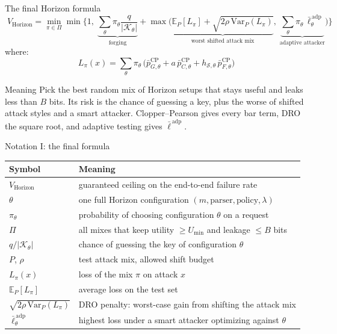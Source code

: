 \documentclass[aspectratio=169,11pt]{beamer}
\begin{document}
\begin{frame}{The final Horizon formula}
  \footnotesize
  \[
    \boxed{\;
    V_{\mathrm{Horizon}} = \min_{\pi \in \Pi} \min\Bigg\{1,\;
    \underbrace{\sum_\theta \pi_\theta \frac{q}{|\mathcal{K}_\theta|}}_{\text{forging}}
    + \max\Big(
    \underbrace{\mathbb{E}_P[L_\pi] + \sqrt{2\rho\,\mathrm{Var}_P(L_\pi)}}_{\text{worst shifted attack mix}},\;
    \underbrace{\sum_\theta \pi_\theta\,\bar\ell^{\,\mathrm{adp}}_\theta}_{\text{adaptive attacker}}
    \Big)\Bigg\}\;}
  \]
  \vspace{-0.3em}
  where:
  \[
    L_\pi(x) = \sum_\theta \pi_\theta\,\Big(\bar p^{\mathrm{CP}}_{G,\theta}
    + a\,\bar p^{\mathrm{CP}}_{C,\theta}
    + h_{\mathcal{S},\theta}\,\bar p^{\mathrm{CP}}_{F,\theta}\Big)
  \]
  \begin{block}{Meaning}
    Pick the best random mix of Horizon setups that stays useful and leaks less than $B$ bits. Its risk is the chance of guessing a key, plus the worse of shifted attack styles and a smart attacker. Clopper--Pearson gives every bar term, DRO the square root, and adaptive testing gives $\bar\ell^{\,\mathrm{adp}}$.
  \end{block}
\end{frame}

\begin{frame}{Notation I: the final formula}
  \centering\small
  \begin{tabular}{@{}ll@{}}
    \toprule
    \textbf{Symbol} & \textbf{Meaning} \\
    \midrule
    $V_{\mathrm{Horizon}}$ & guaranteed ceiling on the end-to-end failure rate \\
    $\theta$ & one full Horizon configuration $(m, \text{parser}, \text{policy}, \lambda)$ \\
    $\pi_\theta$ & probability of choosing configuration $\theta$ on a request \\
    $\Pi$ & all mixes that keep utility $\ge U_{\min}$ and leakage $\le B$ bits \\
    $q / |\mathcal{K}_\theta|$ & chance of guessing the key of configuration $\theta$ \\
    $P$, $\rho$ & test attack mix, allowed shift budget \\
    $L_\pi(x)$ & loss of the mix $\pi$ on attack $x$ \\
    $\mathbb{E}_P[L_\pi]$ & average loss on the test set \\
    $\sqrt{2\rho\,\mathrm{Var}_P(L_\pi)}$ & DRO penalty: worst-case gain from shifting the attack mix \\
    $\bar\ell^{\,\mathrm{adp}}_\theta$ & highest loss under a smart attacker optimizing against $\theta$ \\
    \bottomrule
  \end{tabular}
\end{frame}
\end{document}
